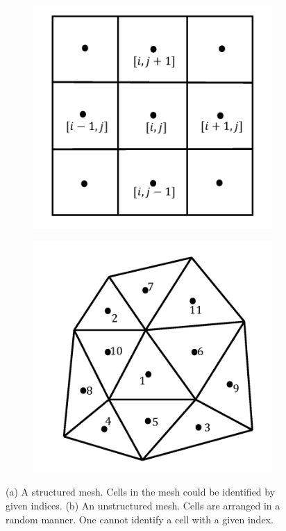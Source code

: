 \begin{figure}
  \centering
  \begin{subfigure}{0.5\linewidth}
    \centering
    \includegraphics[width=0.8\linewidth]{img/intro/mStructured.png}
    \caption{}
    \label{fig-structured-ij}
  \end{subfigure}%
  \begin{subfigure}{0.5\linewidth}
    \centering
    \includegraphics[width=0.8\linewidth]{img/intro/mUnstructured.png}
    \caption{}
    \label{fig-unstructured}
  \end{subfigure}%
  \caption[Structured and Unstructured meshes]{(a) A structured mesh. Cells in the mesh could be identified by given indices. (b) An unstructured mesh. Cells are arranged in a random manner. One cannot identify a cell with a given index.}
  \label{fig-structured-unstructured}
\end{figure}

